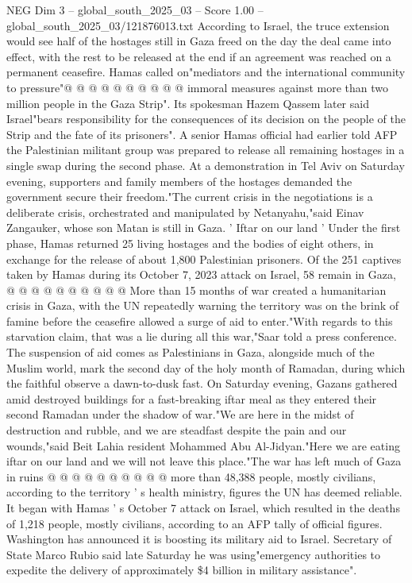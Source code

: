 \begin{textsample}{NEG Dim 3 – global\_south\_2025\_03 – Score 1.00 – global\_south\_2025\_03/121876013.txt}
According to Israel, the truce extension would see half of the hostages still in Gaza freed on the day the deal came into effect, with the rest to be released at the end if an agreement was reached on a permanent ceasefire.
Hamas called on"mediators and the international community to pressure"@ @ @ @ @ @ @ @ @ @ immoral measures against more than two million people in the Gaza Strip".
Its spokesman Hazem Qassem later said Israel"bears responsibility for the consequences of its decision on the people of the Strip and the fate of its prisoners".
A senior Hamas official had earlier told AFP the Palestinian militant group was prepared to release all remaining hostages in a single swap during the second phase.
At a demonstration in Tel Aviv on Saturday evening, supporters and family members of the hostages demanded the government secure their freedom."The current crisis in the negotiations is a deliberate crisis, orchestrated and manipulated by Netanyahu,"said Einav Zangauker, whose son Matan is still in Gaza. ' Iftar on our land ' Under the first phase, Hamas returned 25 living hostages and the bodies of eight others, in exchange for the release of about 1,800 Palestinian prisoners.
Of the 251 captives taken by Hamas during its October 7, 2023 attack on Israel, 58 remain in Gaza, @ @ @ @ @ @ @ @ @ @ More than 15 months of war created a humanitarian crisis in Gaza, with the UN repeatedly warning the territory was on the brink of famine before the ceasefire allowed a surge of aid to enter."With regards to this starvation claim, that was a lie during all this war,"Saar told a press conference.
The suspension of aid comes as Palestinians in Gaza, alongside much of the Muslim world, mark the second day of the holy month of Ramadan, during which the faithful observe a dawn-to-dusk fast.
On Saturday evening, Gazans gathered amid destroyed buildings for a fast-breaking iftar meal as they entered their second Ramadan under the shadow of war."We are here in the midst of destruction and rubble, and we are steadfast despite the pain and our wounds,"said Beit Lahia resident Mohammed Abu Al-Jidyan."Here we are eating iftar on our land and we will not leave this place."The war has left much of Gaza in ruins @ @ @ @ @ @ @ @ @ @ more than 48,388 people, mostly civilians, according to the territory ' s health ministry, figures the UN has deemed reliable.
It began with Hamas ' s October 7 attack on Israel, which resulted in the deaths of 1,218 people, mostly civilians, according to an AFP tally of official figures.
Washington has announced it is boosting its military aid to Israel.
Secretary of State Marco Rubio said late Saturday he was using"emergency authorities to expedite the delivery of approximately \$4 billion in military assistance".

\end{textsample}
